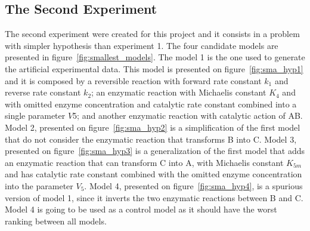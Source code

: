 
\subsection{The Second Experiment}
The second experiment were created for this project and it consists in a
problem with simpler hypothesis than experiment 1. The four candidate
models are presented in figure~\ref{fig:smallest_models}. The model 1
is the one used to generate the artificial experimental data. This model
is presented on figure~\ref{fig:sma_hyp1} and it is composed by a 
reversible reaction  with forward rate constant $k_1$ 
and reverse rate constant $k_2$; an enzymatic reaction  with 
Michaelis constant $K_4$ and with omitted enzyme concentration and 
catalytic rate constant combined into a single parameter $V5$; and 
another enzymatic reaction  with catalytic action of AB. 
Model 2, presented on figure~\ref{fig:sma_hyp2} is a simplification of
the first model that do not consider the enzymatic reaction that 
transforms B into C. Model 3, presented on figure~\ref{fig:sma_hyp3} is
a generalization of the first model that adds an enzymatic reaction that
can transform C into A, with Michaelis constant $K_{5m}$ and has 
catalytic rate constant combined with the omitted enzyme concentration 
into the parameter $V_5$. Model 4, presented on 
figure~\ref{fig:sma_hyp4}, is a spurious version of model 1, since it 
inverts the two enzymatic reactions between B and C. Model 4 is going to
be used as a control model as it should have the worst ranking between
all models.


